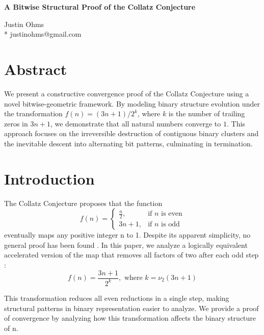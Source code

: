 \documentclass[10pt,letterpaper]{article}
\begin{document}
\vspace*{0.35in}

\begin{flushleft}
{\Large
\textbf{A Bitwise Structural Proof of the Collatz Conjecture}
}
\bigskip

Justin Ohms\\
* justinohms@gmail.com

\end{flushleft}

\section*{Abstract}
We present a constructive convergence proof of the Collatz Conjecture using a novel bitwise-geometric framework. By modeling binary structure evolution under the transformation $f(n) = (3n + 1)/2^k$, where $k$ is the number of trailing zeros in $3n + 1$, we demonstrate that all natural numbers converge to $1$. This approach focuses on the irreversible destruction of contiguous binary clusters and the inevitable descent into alternating bit patterns, culminating in termination.


\section{Introduction}
The Collatz Conjecture proposes that the function
\begin{equation}
f(n) = \begin{cases} \frac{n}{2}, & \text{if } n \text{ is even} \\ 3n + 1, & \text{if } n \text{ is odd} \end{cases}
\end{equation}
eventually maps any positive integer n to 1. Despite its apparent simplicity, no general proof has been found \cite{Lagarias1985}. In this paper, we analyze a logically equivalent accelerated version of the map that removes all factors of two after each odd step \cite{Terras1976}: 
\begin{equation} f(n) = \frac{3n + 1}{2^k}, \text{ where } k = \nu_2(3n + 1) \end{equation}

This transformation reduces all even reductions in a single step, making structural patterns in binary representation easier to analyze. We provide a proof of convergence by analyzing how this transformation affects the binary structure of n.
\end{document}
